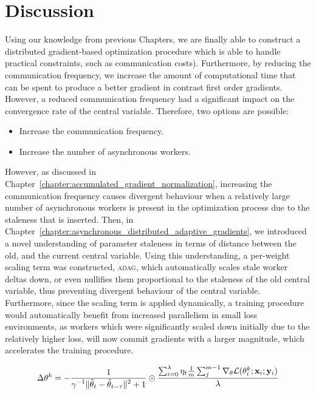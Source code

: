 \section{Discussion}
\label{sec:adag_discussion}

Using our knowledge from previous Chapters, we are finally able to construct a distributed gradient-based optimization procedure which is able to handle practical constraints, such as communication costs). Furthermore, by reducing the communication frequency, we increase the amount of computational time that can be spent to produce a better gradient in contrast first order gradients. However, a reduced communication frequency had a significant impact on the convergence rate of the central variable. Therefore, two options are possible:

\begin{itemize}
\item Increase the communication frequency.
\item Increase the number of asynchronous workers.
\end{itemize}

However, as discussed in Chapter~\ref{chapter:accumulated_gradient_normalization}, increasing the communication frequency causes divergent behaviour when a relatively large number of asynchronous workers is present in the optimization process due to the staleness that is inserted. Then, in Chapter~\ref{chapter:asynchronous_distributed_adaptive_gradients}, we introduced a novel understanding of parameter staleness in terms of distance between the old, and the current central variable. Using this understanding, a per-weight scaling term was constructed, \textsc{adag}, which automatically scales stale worker deltas down, or even nullifies them proportional to the staleness of the old central variable, thus preventing divergent behaviour of the central variable. Furthermore, since the scaling term is applied dynamically, a training procedure would automatically benefit from increased parallelism in small loss environments, as workers which were significantly scaled down initially due to the relatively higher loss, will now commit gradients with a larger magnitude, which accelerates the training procedure.

\begin{equation}
  \label{eq:adag_agn_worker}
  \Delta\theta^k = -\frac{\displaystyle 1}{\displaystyle \gamma^{-1}\|\tilde{\theta}_t - \tilde{\theta}_{t - \tau}\|^2 + 1} \odot \frac{\sum_{i = 0}^\lambda \eta_t \frac{1}{m}\sum_j^{m - 1} \nabla_\theta \mathcal{L}(\theta^k_i;\mathbf{x}_i;\mathbf{y}_i) }{\lambda}
\end{equation}

